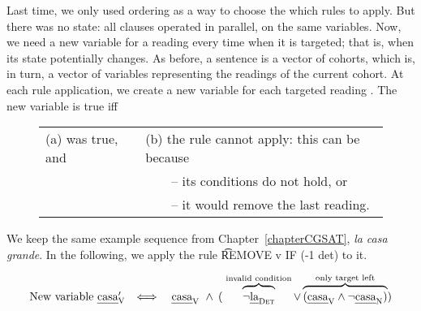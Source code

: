 %
%
%
%
%
Last time, we only used ordering as a way to choose the which rules to apply.
But there was no state: all clauses operated in parallel, on the same variables. 
Now, we need a new variable for a reading every time when it is targeted; 
that is, when its state potentially changes.
As before, a sentence is a vector of cohorts, which is, in turn, a vector of variables representing the readings of the current cohort.
At each rule application, we create a new variable \newVar{} for each targeted reading \oldVar{}.
The new variable \newVar{} is true iff 

\begin{figure}[h]
\begin{tabular}{l l}
(a) \oldVar{} was true, and 
                             & (b) the rule cannot apply: this can be because \\
                                     & ~~~~-- its conditions do not hold, or \\
                                     & ~~~~-- it would remove the last reading.
\end{tabular}
\end{figure}

\noindent We keep the same example sequence from Chapter~\ref{chapterCGSAT}, {\em la casa grande}. In the following, we apply the rule \t{REMOVE v IF (-1 det)} to it.

$$\begin{array}{r l}
\text{New variable } \casa{}'_\v 
      & \Longleftrightarrow \quad \casaV\ 
        \wedge\: ( \; \ob{\neg\laDet}^{\invConds} 
        \vee  \ob{(\casaV \wedge \neg \casaN) }^{\onlyTrgLeft} ) \\
\end{array}$$


